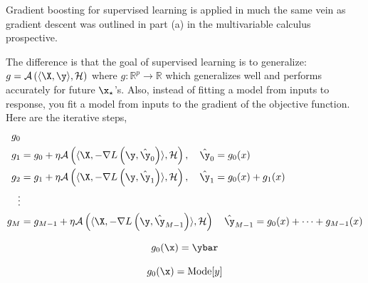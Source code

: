 \documentclass[12pt]{article}
\begin{document}
\begin{enumerate}
\begin{tcolorbox}[colback=white, sharp corners]
Gradient boosting for supervised learning is applied in much the same vein as gradient descent was outlined in part (a) in the multivariable calculus prospective. 
 
The difference is that the goal of supervised learning is to generalize: \\ $g = \mathcal{A}\left( \langle \X, \y \rangle, \mathcal{H} \right)$ where $g: \mathbb{R}^p \to \mathbb{R}$ which generalizes well and performs accurately for future $\x_{\star}$'s. Also, instead of fitting a model from inputs to response, you fit a model from inputs to the gradient of the objective function. Here are the iterative steps,
\begin{align*}
g_0 & \\ 
g_1 &= g_0 + \eta \mathcal{A}\left( \langle \X, - \nabla L \left( \y, \hat{\y}_0 \right) \rangle, \mathcal{H} \right), \quad \hat{\y}_0 = g_0(x) \\
g_2 &= g_1 + \eta \mathcal{A}\left( \langle \X, - \nabla L \left( \y, \hat{\y}_1 \right) \rangle, \mathcal{H} \right), \quad \hat{\y}_1 = g_0(x) + g_1(x)  \\
\vdots & \\
g_M &= g_{M-1} + \eta \mathcal{A}\left( \langle \X, - \nabla L \left( \y, \hat{\y}_{M-1} \right) \rangle, \mathcal{H} \right) \quad \hat{\y}_{M-1} = g_0(x) + \cdots + g_{M-1}(x)
\end{align*}
\end{tcolorbox}


\begin{tcolorbox}[colback=white, sharp corners]
\[
	g_0(\x) = \ybar
\]
\end{tcolorbox}


\begin{tcolorbox}[colback=white, sharp corners]
\[
	g_0(\x) = \text{Mode}[y]
\]
\end{tcolorbox}



\end{enumerate}
\end{document}
